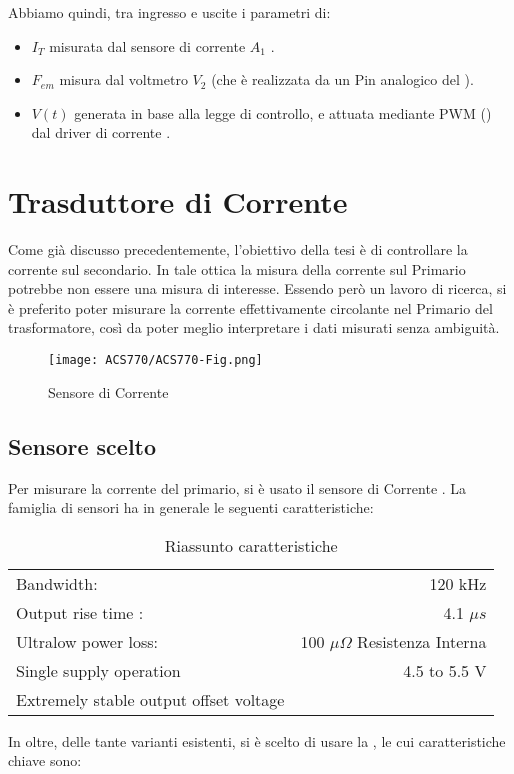 Abbiamo quindi, tra ingresso e uscite i parametri di:
\begin{itemize}
	\item $I_T$ misurata dal sensore di corrente $ A_1 $ .
	\item $F_{em}$ misura dal voltmetro $V_2$ (che è realizzata da un Pin analogico del \microC).
	\item $V(t)$ generata in base alla legge di controllo, e attuata mediante PWM (\cite{modulazionePWM}) dal driver di corrente .
\end{itemize}


\newpage


\section{Trasduttore di Corrente}\label{CurrentSense}
Come già discusso precedentemente, l'obiettivo della tesi è di controllare la corrente sul secondario. In tale ottica la misura della corrente sul Primario potrebbe non essere una misura di interesse. Essendo però un lavoro di ricerca, si è preferito poter misurare la corrente effettivamente circolante nel Primario del trasformatore, così da poter meglio interpretare i dati misurati senza ambiguità.
\begin{figure}[H]
	\centering
	\caption[Sensore di Corrente ]{Sensore di Corrente}
	\texttt{[image: ACS770/ACS770-Fig.png]}
\end{figure}
\subsection{Sensore scelto}
Per misurare la corrente del primario, si è usato il sensore di Corrente \cite{ACS770}. La famiglia di sensori ha in generale le seguenti caratteristiche:
\begin{table}[H]
	\centering
	\label{tab:ACS770ParametriGenerali}
	\caption[\cite{ACS770}  Riassunto caratteristiche]{Riassunto caratteristiche}
	\begin{tabular}[t]{|l r|}
		\hline
		Bandwidth:                             & 120 kHz                               \\
		Output rise time :                     & 4.1 $ \mu s $                         \\
		Ultralow power loss:                   & 100 $ \mu \Omega $ Resistenza Interna \\
		Single supply operation                & 4.5 to 5.5 V                          \\
		Extremely stable output offset voltage &                                       \\
		\hline
	\end{tabular}
\end{table}
\noindent
In oltre, delle tante varianti esistenti, si è scelto di usare la , le cui caratteristiche chiave sono:

